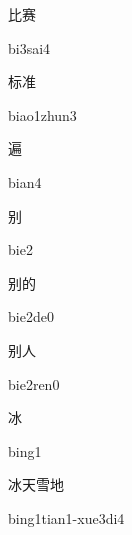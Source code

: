 \begin{multicols*}{2}
\begin{verbete}[bi3sai4]{比赛}
\begin{pronuncia}{bi3sai4}
\end{pronuncia}
\end{verbete}

\begin{verbete}{标准}
\begin{pronuncia}{biao1zhun3}
\end{pronuncia}
\end{verbete}

\begin{verbete}[bian4]{遍}
\begin{pronuncia}{bian4}
\end{pronuncia}
\end{verbete}

\begin{verbete}[bie2]{别}
\begin{pronuncia}{bie2}
\end{pronuncia}
\end{verbete}

\begin{verbete}[bie2de0]{别的}
\begin{pronuncia}{bie2de0}
\end{pronuncia}
\end{verbete}

\begin{verbete}{别人}
\begin{pronuncia}{bie2ren0}
\end{pronuncia}
\end{verbete}

\begin{verbete}[bing1]{冰}
\begin{pronuncia}{bing1}
\end{pronuncia}
\end{verbete}

\begin{verbete}{冰天雪地}
\begin{pronuncia}{bing1tian1-xue3di4}
\end{pronuncia}
\end{verbete}


\end{multicols*}

